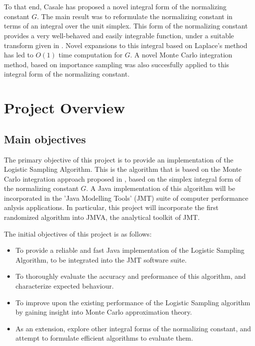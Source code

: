 \\\\
To that end, Casale \cite{Casale2017AcceleratingMethods} has proposed a novel integral form of the normalizing constant \(G\). The main result was to reformulate the normalizing constant in terms of an integral over the unit simplex. This form of the normalizing constant provides a very well-behaved and easily integrable function, under a suitable transform given in \cite{Aitchison1982TheData}. Novel expansions to this integral based on Laplace's method has led to \(O(1)\) time computation for \(G\). A novel Monte Carlo integration method, based on importance sampling was also succesfully applied to this integral form of the normalizing constant. 

\section{Project Overview}
\subsection{Main objectives}
The primary objective of this project is to provide an implementation of the Logistic Sampling Algorithm. This is the algorithm that is based on the Monte Carlo integration approach proposed in \cite{Casale2017AcceleratingMethods}, based on the simplex integral form of the normalizing constant \(G\). A Java implementation of this algorithm will be incorporated in the 'Java Modelling Tools' (JMT) \cite{JavaJMT} suite of computer performance anlysis applications. In particular, this project will incorporate the first randomized algorithm into JMVA, the analytical toolkit of JMT.

The initial objectives of this project is as follows:
\begin{itemize}
    \item To provide a reliable and fast Java implementation of the Logistic Sampling Algorithm, to be integrated into the JMT software suite.
    \item To thoroughly evaluate the accuracy and preformance of this algorithm, and characterize expected behaviour.
    \item To improve upon the existing performance of the Logistic Sampling algorithm by gaining insight into Monte Carlo approximation theory.
    \item As an extension, explore other integral forms of the normalizing constant, and attempt to formulate efficient algorithms to evaluate them.
\end{itemize}

